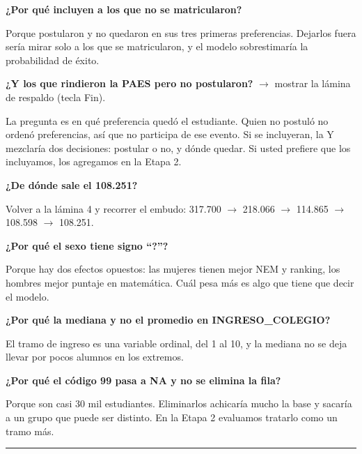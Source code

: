 \documentclass[11pt]{article}
\begin{document}
\textbf{¿Por qué incluyen a los que no se matricularon?}\par
\begin{guion}Porque postularon y no quedaron en sus tres primeras preferencias. Dejarlos fuera sería mirar solo a los que se matricularon, y el modelo sobrestimaría la probabilidad de éxito.\end{guion}

\textbf{¿Y los que rindieron la PAES pero no postularon?} $\rightarrow$ mostrar la lámina de respaldo (tecla Fin).\par
\begin{guion}La pregunta es en qué preferencia quedó el estudiante. Quien no postuló no ordenó preferencias, así que no participa de ese evento. Si se incluyeran, la Y mezclaría dos decisiones: postular o no, y dónde quedar. Si usted prefiere que los incluyamos, los agregamos en la Etapa 2.\end{guion}

\textbf{¿De dónde sale el 108.251?}\par
\begin{guion}Volver a la lámina 4 y recorrer el embudo: 317.700 $\rightarrow$ 218.066 $\rightarrow$ 114.865 $\rightarrow$ 108.598 $\rightarrow$ 108.251.\end{guion}

\textbf{¿Por qué el sexo tiene signo ``?''?}\par
\begin{guion}Porque hay dos efectos opuestos: las mujeres tienen mejor NEM y ranking, los hombres mejor puntaje en matemática. Cuál pesa más es algo que tiene que decir el modelo.\end{guion}

\textbf{¿Por qué la mediana y no el promedio en INGRESO\_COLEGIO?}\par
\begin{guion}El tramo de ingreso es una variable ordinal, del 1 al 10, y la mediana no se deja llevar por pocos alumnos en los extremos.\end{guion}

\textbf{¿Por qué el código 99 pasa a NA y no se elimina la fila?}\par
\begin{guion}Porque son casi 30 mil estudiantes. Eliminarlos achicaría mucho la base y sacaría a un grupo que puede ser distinto. En la Etapa 2 evaluamos tratarlo como un tramo más.\end{guion}

\medskip\hrule\medskip
\end{document}
